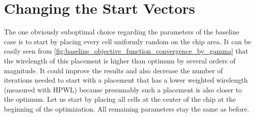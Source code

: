 \section{Changing the Start Vectors} \label{sec:changing_start_vectors}

The one obviously suboptimal choice regarding the parameters of the baseline case is to start by placing every cell uniformly random on the chip area.
It can be easily seen from \cref{fig:baseline_objective_function_convergence_by_gamma} that the wirelength of this placement
is higher than optimum by several orders of magnitude.
It could improve the results and also decrease the number of iterations needed
to start with a placement that has a lower weighted wirelength (measured with HPWL)
because presumably such a placement is also closer to the optimum.
Let us start by placing all cells at the center of the chip at the beginning of the optimization.
All remaining parameters stay the same as before.

